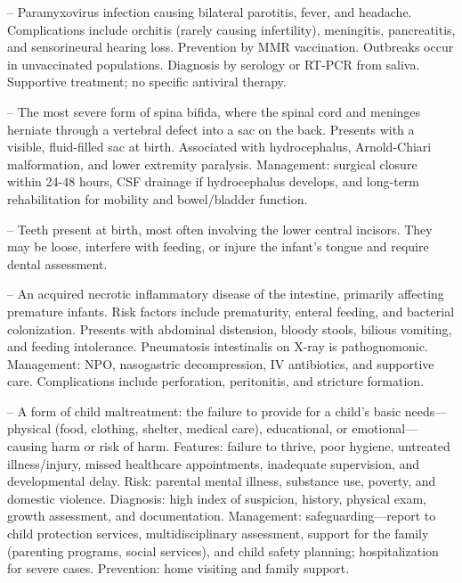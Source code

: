 -- Paramyxovirus infection causing bilateral parotitis, fever, and headache. Complications include orchitis (rarely causing infertility), meningitis, pancreatitis, and sensorineural hearing loss. Prevention by MMR vaccination. Outbreaks occur in unvaccinated populations. Diagnosis by serology or RT-PCR from saliva. Supportive treatment; no specific antiviral therapy.

-- The most severe form of spina bifida, where the spinal cord and meninges herniate through a vertebral defect into a sac on the back. Presents with a visible, fluid-filled sac at birth. Associated with hydrocephalus, Arnold-Chiari malformation, and lower extremity paralysis. Management: surgical closure within 24-48 hours, CSF drainage if hydrocephalus develops, and long-term rehabilitation for mobility and bowel/bladder function.

-- Teeth present at birth, most often involving the lower central incisors. They may be loose, interfere with feeding, or injure the infant's tongue and require dental assessment.

-- An acquired necrotic inflammatory disease of the intestine, primarily affecting premature infants. Risk factors include prematurity, enteral feeding, and bacterial colonization. Presents with abdominal distension, bloody stools, bilious vomiting, and feeding intolerance. Pneumatosis intestinalis on X-ray is pathognomonic. Management: NPO, nasogastric decompression, IV antibiotics, and supportive care. Complications include perforation, peritonitis, and stricture formation.

-- A form of child maltreatment: the failure to provide for a child's basic needs—physical (food, clothing, shelter, medical care), educational, or emotional—causing harm or risk of harm. Features: failure to thrive, poor hygiene, untreated illness/injury, missed healthcare appointments, inadequate supervision, and developmental delay. Risk: parental mental illness, substance use, poverty, and domestic violence. Diagnosis: high index of suspicion, history, physical exam, growth assessment, and documentation. Management: safeguarding—report to child protection services, multidisciplinary assessment, support for the family (parenting programs, social services), and child safety planning; hospitalization for severe cases. Prevention: home visiting and family support.

